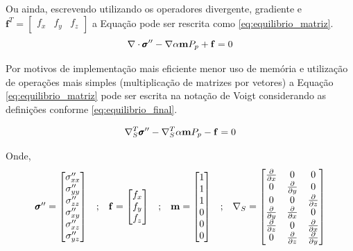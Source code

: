 Ou ainda, escrevendo utilizando os operadores divergente, gradiente e $\mathbf{f}^T=\begin{bmatrix}f_x & f_y & f_z\end{bmatrix}$ a Equação pode ser rescrita como \eqref{eq:equilibrio_matriz}.
\begin{equation}
\label{eq:equilibrio_matriz}
\nabla \cdot \stef - \nabla \alpha \mathbf{m} P_p + \mathbf{f} = 0
\end{equation}

Por motivos de implementação mais eficiente menor uso de memória e utilização de operações mais simples (multiplicação de matrizes por vetores) a Equação \eqref{eq:equilibrio_matriz} pode ser escrita na notação de Voigt  considerando as definições conforme \eqref{eq:equilibrio_final}.

\begin{equation}
\label{eq:equilibrio_final}
\sopnabla^T \stef - \sopnabla^T\alpha \mathbf{m}  P_p - \mathbf{f} = 0
\end{equation}

Onde,
\begin{equation}
\begin{matrix}\label{eq:definicoesvoigt}
\pmb{\sigma}^{\prime\prime} = \begin{bmatrix}
\sigma^{\prime\prime}_{xx}
\\
\sigma^{\prime\prime}_{yy}
\\
\sigma^{\prime\prime}_{zz}
\\
\sigma^{\prime\prime}_{xy}
\\
\sigma^{\prime\prime}_{xz}
\\
\sigma^{\prime\prime}_{yz}
\end{bmatrix}
&

;

&

\mathbf{f} = \begin{bmatrix}
f_{x}
\\
f_{y}
\\
f_{z}
\end{bmatrix}
&
;
&

\mathbf{m} = \begin{bmatrix} 1 \\ 1 \\ 1 \\ 0 \\ 0 \\ 0\end{bmatrix}

&
;

&
\nabla_S = \begin{bmatrix} \frac{\partial { }}{\partial x} & 0 & 0 \\ 0 & \frac{\partial { }}{\partial y} & 0 \\ 0 & 0 & \frac{\partial { }}{\partial z} \\ \frac{\partial { }}{\partial y} & \frac{\partial { }}{\partial x} & 0 \\ \frac{\partial { }}{\partial z} & 0 & \frac{\partial { }}{\partial x} \\ 0 & \frac{\partial { }}{\partial z} & \frac{\partial { }}{\partial y} \end{bmatrix}
\end{matrix}
\end{equation}




